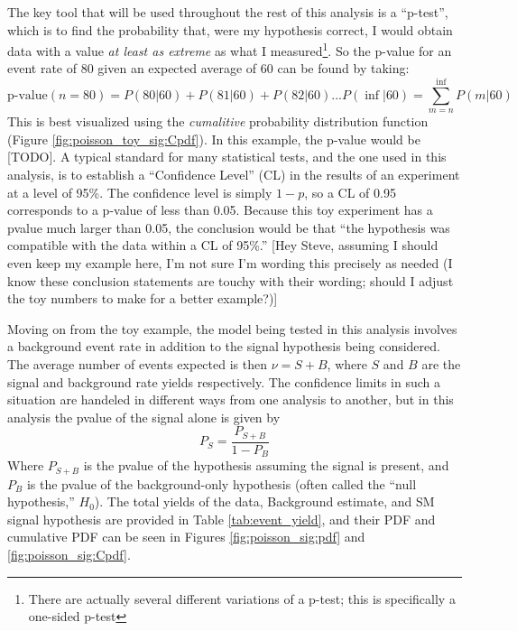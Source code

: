     \FloatBarrier
    The key tool that will be used throughout the rest of this analysis is a ``p-test'',
        which is to find the probability that, were my hypothesis correct,
        I would obtain data with a value \textit{at least as extreme} as what I measured\footnote{
            There are actually several different variations of a p-test;
            this is specifically a one-sided p-test}.
    So the p-value for an event rate of 80 given an expected average of 60 can be found by taking:
    \begin{equation}
        \textrm{p-value}(n=80) = P(80|60) + P(81|60) + P(82|60) ... P(\inf|60) = \sum\limits_{m=n}^\inf P(m|60)
    \end{equation}
    This is best visualized using the \textit{cumalitive} probability distribution function (Figure \ref{fig:poisson_toy_sig:Cpdf}).
    In this example, the p-value would be [TODO].
    A typical standard for many statistical tests, and the one used in this analysis,
        is to establish a ``Confidence Level'' (CL) in the results of an experiment at a level of 95\%. 
    The confidence level is simply $1-p$, so a CL of 0.95 corresponds to a p-value of less than 0.05.
    Because this toy experiment has a pvalue much larger than 0.05,
        the conclusion would be that ``the hypothesis was compatible with the data within a CL of 95\%.''
    [Hey Steve, assuming I should even keep my example here, I'm not sure I'm wording this precisely as needed 
        (I know these conclusion statements are touchy with their wording;
        should I adjust the toy numbers to make for a better example?)]


    Moving on from the toy example, the model being tested in this analysis involves a background event rate
        in addition to the signal hypothesis being considered.
    The average number of events expected is then $\nu = S + B$,
        where $S$ and $B$ are the signal and background rate yields respectively.
    The confidence limits in such a situation are handeled in different ways from one analysis to another,
        but in this analysis the pvalue of the signal alone is given by
    \begin{equation}
        P_S = \frac{P_{S+B}}{1 - P_B}
    \end{equation}
    Where $P_{S+B}$ is the pvalue of the hypothesis assuming the signal is present,
        and $P_B$ is the pvalue of the background-only hypothesis
        (often called the ``null hypothesis,'' $H_0$).
    The total yields of the data, Background estimate, and SM signal hypothesis are provided in Table \ref{tab:event_yield},
        and their PDF and cumulative PDF can be seen in
        Figures \ref{fig:poisson_sig:pdf} and \ref{fig:poisson_sig:Cpdf}.

